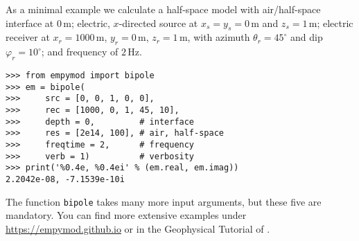 \documentclass[manuscript,revised]{geophysics}
\begin{document}
As a minimal example we calculate a half-space model with air/half-space
interface at $0\,$m; electric, $x$-directed source at $x_s=y_s=0\,$m and
$z_s=1\,$m; electric receiver at $x_r=1000\,$m, $y_r=0\,$m, $z_r=1\,$m, with
azimuth $\theta_r=45^\circ$ and dip $\varphi_r=10^\circ$; and frequency of
$2\,$Hz.

\begin{verbatim}
>>> from empymod import bipole
>>> em = bipole(
>>>     src = [0, 0, 1, 0, 0],
>>>     rec = [1000, 0, 1, 45, 10],
>>>     depth = 0,         # interface
>>>     res = [2e14, 100], # air, half-space
>>>     freqtime = 2,      # frequency
>>>     verb = 1)          # verbosity
>>> print('%0.4e, %0.4ei' % (em.real, em.imag))
2.2042e-08, -7.1539e-10i
\end{verbatim}

The function \texttt{bipole} takes many more input arguments, but these
five are mandatory. You can find more extensive examples under
\url{https://empymod.github.io} or in the Geophysical Tutorial of
\cite{TLE.17.Werthmuller}.
\end{document}
